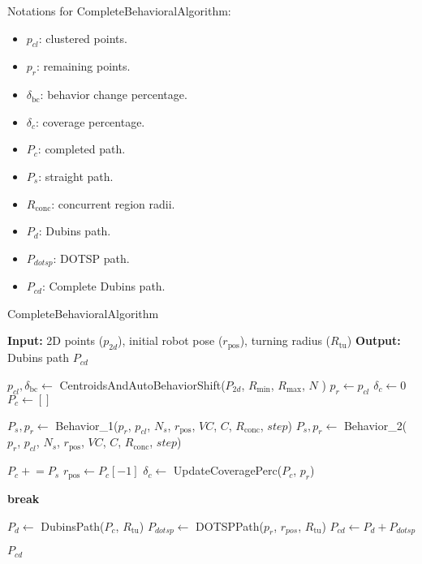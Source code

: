 \vspace*{6mm}  

Notations for CompleteBehavioralAlgorithm:
\begin{multicols}{2}
\begin{itemize}[noitemsep,topsep=0pt]
    \item $p_{cl}$: clustered points.
    \item $p_r$: remaining points.
    \item $\delta_{\text{bc}}$: behavior change percentage.
    \item $\delta_c$: coverage percentage.
    \item $P_c$: completed path.
    \item $P_s$: straight path.
    \item $R_{\text{conc}}$: concurrent region radii.
    \item $P_d$: Dubins path.
    \item $P_{dotsp}$: DOTSP path.
    \item $P_{cd}$: Complete Dubins path.
\end{itemize}
\end{multicols}

\begin{algorithm}[H]
    \caption{CompleteBehavioralAlgorithm}
    \label{alg:completebehavioralalgorithm}
    \begin{algorithmic}[1]
    \Statex \textbf{Input:} 2D points ($p_{2d}$), initial robot pose ($r_{\text{pos}}$), turning radius ($R_{\text{tu}}$) 
    \Statex \textbf{Output:} Dubins path $P_{cd}$
    \newline

    \State $p_{cl}, \delta_{\text{bc}} \leftarrow$ CentroidsAndAutoBehaviorShift($P_{2d}$, $R_{\text{min}}$, $R_{\text{max}}$, $N$ )
    \State $p_r \leftarrow p_{cl}$
    \State $\delta_c \leftarrow 0$
    \State $P_c \leftarrow []$
    
            \State $P_s, p_r \leftarrow$ Behavior\_1($p_r$, $p_{cl}$, $N_s$, $r_{\text{pos}}$, $VC$, $C$, $R_{\text{conc}}$, $step$)
        \Else
            \State $P_s, p_r \leftarrow$ Behavior\_2($p_r$, $p_{cl}$, $N_s$, $r_{\text{pos}}$, $VC$, $C$, $R_{\text{conc}}$, $step$)
        \EndIf
        
        \State $P_c \mathrel{+}= P_s$
        \State $r_{\text{pos}} \leftarrow P_c[-1]$
        \State $\delta_c \leftarrow$ UpdateCoveragePerc($P_c$, $p_r$)
        
            \State \textbf{break}
        \EndIf
    \EndWhile
    
    \State $P_d \leftarrow$ DubinsPath($P_c$, $R_{\text{tu}}$)
    \State $P_{dotsp} \leftarrow$ DOTSPPath($p_r$, $r_{pos}$, $R_{\text{tu}}$)
    \State $P_{cd} \leftarrow P_d + P_{dotsp}$

    \State \Return $P_{cd}$
    \end{algorithmic}
\end{algorithm}
    

